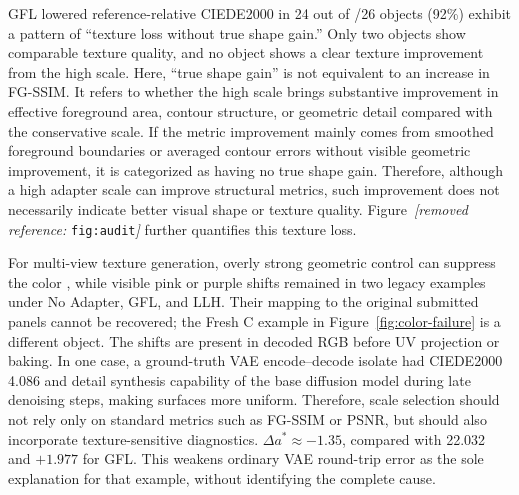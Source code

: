\documentclass[times,twocolumn,final]{elsarticle}
\providecommand{\DIFadd}[1]{{\protect\color{blue} \sf #1}} %
\providecommand{\DIFdel}[1]{{\protect\color{red} \scriptsize #1}} %
\providecommand{\DIFaddbegin}{} %
\providecommand{\DIFaddend}{} %
\providecommand{\DIFdelbegin}{} %
\providecommand{\DIFdelend}{} %
\begin{document}
\DIFadd{GFL lowered reference-relative CIEDE2000 in }\DIFaddend 24\DIFdelbegin \DIFdel{out of }\DIFdelend \DIFaddbegin \DIFadd{/}\DIFaddend 26 objects\DIFdelbegin \DIFdel{(92\%) exhibit a pattern of ``texture loss without true shape gain.'' Only two objects show comparable texture quality, and no object shows a clear texture improvement from the high scale. Here, ``true shape gain'' is not equivalent to an increase in FG-SSIM. It refers to whether the high scale brings substantive improvement in effective foreground area, contour structure, or geometric detail compared with the conservative scale. If the metric improvement mainly comes from smoothed foreground boundaries or averaged contour errors without visible geometric improvement, it is categorized as having no true shape gain.
Therefore, although a high adapter scale can improve structural metrics, such improvement does not necessarily indicate better visual shape or texture quality. Figure~\textit{[removed reference: }\texttt{fig:audit}\textit{]} further quantifies this texture loss.
}%


\DIFdel{For multi-view texture generation, overly strong geometric control can suppress the color }\DIFdelend \DIFaddbegin \DIFadd{, while visible pink or purple shifts remained in two legacy examples under No Adapter, GFL, and LLH. Their mapping to the original submitted panels cannot be recovered; the Fresh C example in Figure~\ref{fig:color-failure} is a different object. The shifts are present in decoded RGB before UV projection or baking. In one case, a ground-truth VAE encode--decode isolate had CIEDE2000 4.086 }\DIFaddend and \DIFdelbegin \DIFdel{detail synthesis capability of the base diffusion model during late denoising steps, making surfaces more uniform. Therefore, scale selection should not rely only on standard metrics such as FG-SSIM or PSNR, but should also incorporate texture-sensitive diagnostics. }\DIFdelend \DIFaddbegin \DIFadd{$\Delta a^*\approx-1.35$, compared with 22.032 and $+1.977$ for GFL. This weakens ordinary VAE round-trip error as the sole explanation for that example, without identifying the complete cause.
}\DIFaddend 
\end{document}
